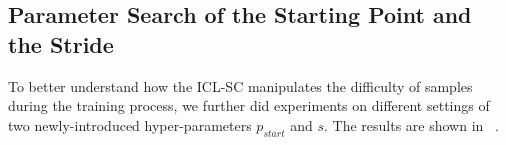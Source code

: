 \subsection{Parameter Search of the Starting Point and the Stride}

To better understand how the ICL-SC manipulates the difficulty of samples during the training process, we further did experiments on different settings of two newly-introduced hyper-parameters $p_{start}$ and $s$. The results are shown in ~.

\begin{figure}[th]
	\centering
	\begin{minipage}[t]{0.5\linewidth}
		\centering
	\end{minipage}%
	\begin{minipage}[t]{0.5\linewidth}
		\centering
\end{minipage}
\end{figure}
